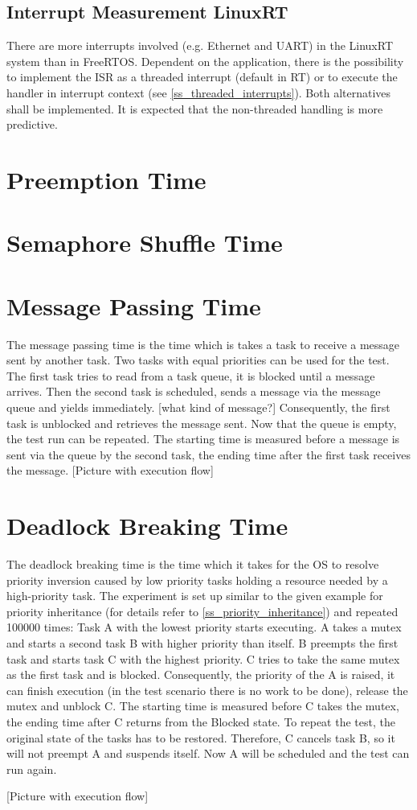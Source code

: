 \subsection{Interrupt Measurement LinuxRT}
There are more interrupts involved (e.g. Ethernet and \ac{UART}) in the LinuxRT system than in FreeRTOS.
Dependent on the application, there is the possibility to implement the \ac{ISR} as a threaded interrupt (default in RT) or to execute the handler in interrupt context (see \ref{ss_threaded_interrupts}).
Both alternatives shall be implemented.
It is expected that the non-threaded handling is more predictive.
 
\section{Preemption Time}
\section{Semaphore Shuffle Time}
\section{Message Passing Time}
The message passing time is the time which is takes a task to receive a message sent by another task.
Two tasks with equal priorities can be used for the test.
The first task tries to read from a task queue, it is blocked until a message arrives.
Then the second task is scheduled, sends a message via the message queue and yields immediately. [what kind of message?] 
Consequently, the first task is unblocked and retrieves the message sent.
Now that the queue is empty, the test run can be repeated.
The starting time is measured before a message is sent via the queue by the second task, the ending time after the first task receives the message.
[Picture with execution flow]

\section{Deadlock Breaking Time}
The deadlock breaking time is the time which it takes for the \ac{OS} to resolve priority inversion caused by low priority tasks holding a resource needed by a high-priority task. 
The experiment is set up similar to the given example for priority inheritance (for details refer to \ref{ss_priority_inheritance}) and repeated 100000 times: 
Task A with the lowest priority starts executing.
A takes a mutex and starts a second task B with higher priority than itself.
B preempts the first task and starts task C with the highest priority. 
C tries to take the same mutex as the first task and is blocked.
Consequently, the priority of the A is raised, it can finish execution (in the test scenario there is no work to be done), release the mutex and unblock C.
The starting time is measured before C takes the mutex, the ending time after C returns from the Blocked state.
To repeat the test, the original state of the tasks has to be restored.
Therefore, C cancels task B, so it will not preempt A and suspends itself.
Now A will be scheduled and the test can run again.

[Picture with execution flow]
